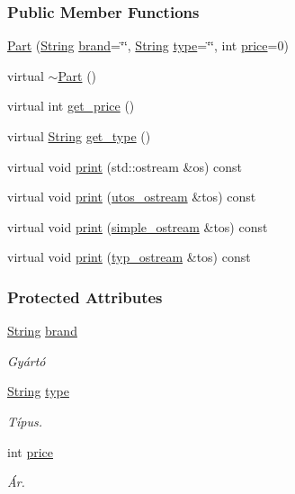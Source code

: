 \subsubsection*{Public Member Functions}
\begin{DoxyCompactItemize}
\item 
\mbox{\hyperlink{class_part_aae5224ee782134c4ecb60f23ec38698f}{Part}} (\mbox{\hyperlink{class_string}{String}} \mbox{\hyperlink{class_part_ae06f2fdeb7fbbdb229a7aca151f3e341}{brand}}=\char`\"{}\char`\"{}, \mbox{\hyperlink{class_string}{String}} \mbox{\hyperlink{class_part_a101dbcc5c4b21564df7414c7eb0eae88}{type}}=\char`\"{}\char`\"{}, int \mbox{\hyperlink{class_part_a8e71223aed1da95a974f33d8d6c91bb1}{price}}=0)
\item 
virtual \mbox{\hyperlink{class_part_aaecbb747a7227f7ce3b44caeaf1801c2}{$\sim$\+Part}} ()
\item 
virtual int \mbox{\hyperlink{class_part_a38bcd0481433acc24db7d5f978f2c839}{get\+\_\+price}} ()
\item 
virtual \mbox{\hyperlink{class_string}{String}} \mbox{\hyperlink{class_part_a02569fd3cf6c52b56baceed5d639f487}{get\+\_\+type}} ()
\item 
virtual void \mbox{\hyperlink{class_part_a4fa402b8e8fd4236ff773a7697ab2bc3}{print}} (std\+::ostream \&os) const
\item 
virtual void \mbox{\hyperlink{class_part_a9ecabe44ba3415badf82c6a23617a41e}{print}} (\mbox{\hyperlink{structutos__ostream}{utos\+\_\+ostream}} \&tos) const
\item 
virtual void \mbox{\hyperlink{class_part_aa602d876151b63db72cf8f666847a8cd}{print}} (\mbox{\hyperlink{structsimple__ostream}{simple\+\_\+ostream}} \&tos) const
\item 
virtual void \mbox{\hyperlink{class_part_ab6396030e8b7a724731a8b54bd4942fc}{print}} (\mbox{\hyperlink{structtyp__ostream}{typ\+\_\+ostream}} \&tos) const
\end{DoxyCompactItemize}
\subsubsection*{Protected Attributes}
\begin{DoxyCompactItemize}
\item 
\mbox{\hyperlink{class_string}{String}} \mbox{\hyperlink{class_part_ae06f2fdeb7fbbdb229a7aca151f3e341}{brand}}
\begin{DoxyCompactList}\small\item\em Gyártó \end{DoxyCompactList}\item 
\mbox{\hyperlink{class_string}{String}} \mbox{\hyperlink{class_part_a101dbcc5c4b21564df7414c7eb0eae88}{type}}
\begin{DoxyCompactList}\small\item\em Típus. \end{DoxyCompactList}\item 
int \mbox{\hyperlink{class_part_a8e71223aed1da95a974f33d8d6c91bb1}{price}}
\begin{DoxyCompactList}\small\item\em Ár. \end{DoxyCompactList}\end{DoxyCompactItemize}



